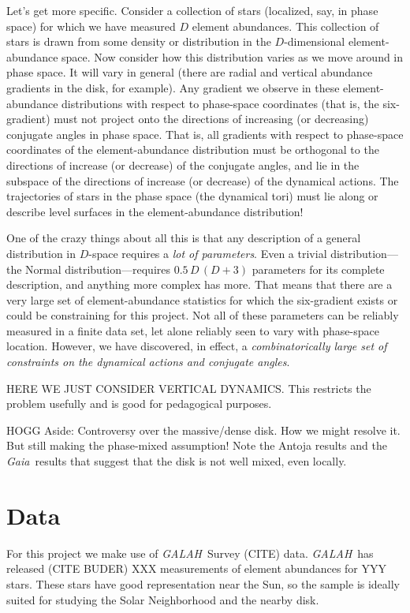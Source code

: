 \documentclass[modern]{aastex62}
\newcommand{\acronym}[1]{{\small{#1}}}
\newcommand{\project}[1]{\textsl{#1}}
\newcommand{\galah}{\project{\acronym{GALAH}}}
\newcommand{\gaia}{\project{Gaia}}
\begin{document}
Let's get more specific.
Consider a collection of stars (localized, say, in phase space) for which we have
measured $D$ element abundances.
This collection of stars is drawn from some density or distribution in
the $D$-dimensional element-abundance space.
Now consider how this distribution varies as we move around in phase space.
It will vary in general (there are radial and vertical abundance gradients in the
disk, for example).
Any gradient we observe in these element-abundance distributions with respect to
phase-space coordinates (that is, the six-gradient) must not project
onto the directions of increasing (or decreasing) conjugate angles in phase space.
That is, all gradients with respect to phase-space coordinates
of the element-abundance distribution must be orthogonal to the
directions of increase (or decrease) of the conjugate angles, and lie in the subspace
of the directions of increase (or decrease) of the dynamical actions.
The trajectories of stars in the phase space (the dynamical tori) must lie along or
describe level surfaces in the element-abundance distribution!

One of the crazy things about all this is that any description of a general distribution in $D$-space
requires a \emph{lot of parameters}.
Even a trivial distribution---the Normal distribution---requires $0.5\,D\,(D+3)$ parameters for its
complete description, and anything more complex has more.
That means that there are a very large set of element-abundance statistics for which the
six-gradient exists or could be constraining for this project.
Not all of these parameters can be reliably measured in a finite data set,
let alone reliably seen to vary with phase-space location.
However,
we have discovered, in effect, a \emph{combinatorically large set of constraints on the
dynamical actions and conjugate angles}.

HERE WE JUST CONSIDER VERTICAL DYNAMICS. This restricts the problem usefully and is good
for pedagogical purposes.

HOGG Aside: Controversy over the massive/dense disk. How we might resolve it.
But still making the phase-mixed assumption! Note the Antoja results and the \gaia\ results
that suggest that the disk is not well mixed, even locally.

\section{Data}

For this project we make use of \galah\ Survey (CITE) data.
\galah\ has released (CITE BUDER) XXX measurements of element abundances for YYY stars.
These stars have good representation near the Sun, so the sample is ideally suited for studying
the Solar Neighborhood and the nearby disk.
\end{document}
